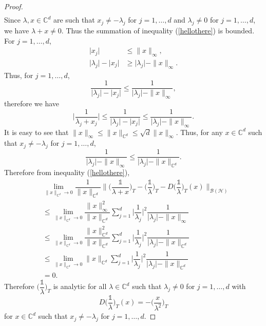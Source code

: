 \documentclass[11pt, reqno]{amsart}
\newcommand\1{\boldsymbol {1}}
\numberwithin{equation}{section}
\begin{document}
\begin{proof}
\begin{align}
\end{align}
Since $\lambda,x\in\mathbb{C}^{d}$ are such that $x_{j}\neq -\lambda_{j}$ for $j=1,\hdots,d$ and $\lambda_{j}\neq 0$ for $j=1,\hdots,d$, we have $\lambda+x\neq 0$. Thus the summation of inequality (\ref{hellothere}) is bounded. For $j=1,\hdots,d$, 
\begin{align*}
    \lvert x_{j}\rvert &\leq \|x\|_{\infty}, \\
    \lvert \lambda_{j}\rvert -\lvert x_{j}\rvert&\geq \lvert \lambda_{j}\rvert-\|x\|_{\infty}.
\end{align*}
Thus, for $j=1,\hdots,d$, 
$$\dfrac{1}{\lvert \lambda_{j}\rvert-\lvert x_{j}\rvert}\leq \dfrac{1}{\lvert \lambda_{j}\rvert - \|x\|_{\infty}},$$
therefore we have
$$\bigg\lvert\dfrac{1}{\lambda_{j}+x_{j}}\bigg\rvert \leq \dfrac{1}{\lvert \lambda_{j} \rvert - \lvert x_{j} \rvert}\leq \dfrac{1}{\lvert \lambda_{j}\rvert - \|x\|_{\infty}}.$$
It is easy to see that $\|x\|_{\infty}\leq \|x\|_{\mathbb{C}^{d}}\leq \sqrt{d}\|x\|_{\infty}$. Thus, for any $x \in \mathbb{C}^d$ such that  $x_{j}\neq -\lambda_{j}$ for $j=1,\hdots,d$,
$$ \dfrac{1}{\lvert\lambda_{j}\rvert-\|x\|_{\infty}}\leq \dfrac{1}{\lvert \lambda_{j}\rvert-\|x\|_{\mathbb{C}^{d}}}.$$
Therefore from inequality (\ref{hellothere}),
\begin{align}
    &\lim_{\|x\|_{\mathbb{C}^{d}}\rightarrow 0}\dfrac{1}{\|x\|_{\mathbb{C}^{d}}}\bigg\|\bigg(\dfrac{\mathds{1}}{\lambda+x}\bigg)_{T}-\bigg(\dfrac{\mathds{1}}{\lambda}\bigg)_{T}-D\bigg(\dfrac{\mathds{1}}{\lambda}\bigg)_{T}(x)\bigg\|_{\mathcal{B(H)}}\nonumber \\
    &\leq \lim_{\|x\|_{\mathbb{C}^{d}}\rightarrow 0}\dfrac{\|x\|^{2}_{\infty}}{\|x\|_{\mathbb{C}^{d}}}\sum_{j=1}^{d}\bigg\lvert\dfrac{1}{\lambda_{j}}\bigg\rvert^{2}\dfrac{1}{\lvert \lambda_{j}\rvert - \|x\|_{\infty}} \nonumber\\
    &\leq \lim_{\|x\|_{\mathbb{C}^{d}}\rightarrow 0}\dfrac{\|x\|^{2}_{\mathbb{C}^{d}}}{\|x\|_{\mathbb{C}^{d}}}\sum_{j=1}^{d}\bigg\lvert\dfrac{1}{\lambda_{j}}\bigg\rvert^{2}\dfrac{1}{\lvert \lambda_{j}\rvert - \|x\|_{\mathbb{C}^{d}}} \nonumber\\
    &\leq \lim_{\|x\|_{\mathbb{C}^{d}}\rightarrow 0}\|x\|_{\mathbb{C}^{d}}\sum_{j=1}^{d}\bigg\lvert\dfrac{1}{\lambda_{j}}\bigg\rvert^{2}\dfrac{1}{\lvert \lambda_{j}\rvert - \|x\|_{\mathbb{C}^{d}}} \nonumber\\
    &=0.\nonumber
\end{align}
Therefore $\bigg(\dfrac{\mathds{1}}{\lambda}\bigg)_{T}$ is analytic for all $\lambda\in\mathbb{C}^{d}$ such that $\lambda_{j}\neq 0$ for $j=1,\hdots,d$ with
$$D\bigg(\dfrac{\mathds{1}}{\lambda}\bigg)_{T}(x) = -\bigg(\dfrac{x}{\lambda^{2}}\bigg)_{T}$$
for $x\in\mathbb{C}^{d}$ such that $x_{j}\neq -\lambda_{j}$ for $j=1,\hdots,d$.


\end{proof}
\end{document}
